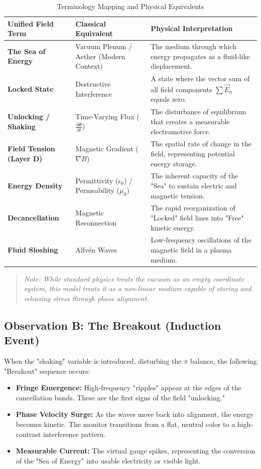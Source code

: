 \documentclass[11pt]{article}
\begin{document}
\begin{table}[h!]
\centering
\caption{Terminology Mapping and Physical Equivalents}
\begin{tabular}{|p{4cm}|p{4cm}|p{6cm}|}
\hline
\textbf{Unified Field Term} & \textbf{Classical Equivalent} & \textbf{Physical Interpretation} \\ \hline
\textbf{The Sea of Energy} & Vacuum Plenum / Aether (Modern Context) & The medium through which energy propagates as a fluid-like displacement. \\ \hline
\textbf{Locked State} & Destructive Interference & A state where the vector sum of all field components $\sum \vec{E}_n$ equals zero. \\ \hline
\textbf{Unlocking / Shaking} & Time-Varying Flux ($\frac{\partial \Phi}{\partial t}$) & The disturbance of equilibrium that creates a measurable electromotive force. \\ \hline
\textbf{Field Tension (Layer D)} & Magnetic Gradient ($\nabla B$) & The spatial rate of change in the field, representing potential energy storage. \\ \hline
\textbf{Energy Density} & Permittivity ($\epsilon_0$) / Permeability ($\mu_0$) & The inherent capacity of the "Sea" to sustain electric and magnetic tension. \\ \hline
\textbf{Decancellation} & Magnetic Reconnection & The rapid reorganization of "Locked" field lines into "Free" kinetic energy. \\ \hline
\textbf{Fluid Sloshing} & Alfvén Waves & Low-frequency oscillations of the magnetic field in a plasma medium. \\ \hline
\end{tabular}
\end{table}

\begin{quote}
\textit{Note: While standard physics treats the vacuum as an empty coordinate system, this model treats it as a non-linear medium capable of storing and releasing stress through phase alignment.}
\end{quote}

\subsection*{Observation B: The Breakout (Induction Event)}
When the "shaking" variable is introduced, disturbing the $\pi$ balance, the following "Breakout" sequence occurs:
\begin{itemize}
    \item \textbf{Fringe Emergence:} High-frequency "ripples" appear at the edges of the cancellation bands. These are the first signs of the field "unlocking."
    \item \textbf{Phase Velocity Surge:} As the waves move back into alignment, the energy becomes kinetic. The monitor transitions from a flat, neutral color to a high-contrast interference pattern.
    \item \textbf{Measurable Current:} The virtual gauge spikes, representing the conversion of the "Sea of Energy" into usable electricity or visible light.
\end{itemize}
\end{document}
